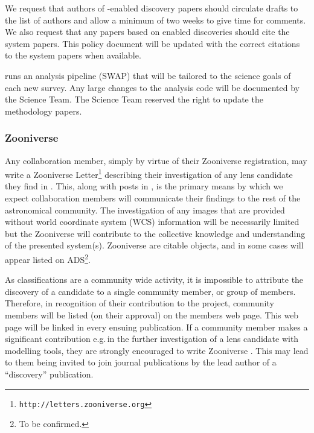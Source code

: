 \documentclass[a4paper]{article}
\begin{document}
We request that authors of \sw-enabled discovery papers should circulate drafts to the list of \sw authors and allow a minimum of two weeks to give time for comments. We also request that any papers based on \sw enabled discoveries should cite the \sw system papers. This policy document will be updated with the correct citations to the \sw system papers when available.

\sw runs an analysis pipeline (SWAP) that will be tailored to the science goals of each new survey. Any large changes to the analysis code will be documented  by the \sw Science Team. The \sw Science Team reserved the right to update the \sw methodology papers.





\subsubsection{Zooniverse \Letters}
\label{sec:comm}

Any \sw collaboration member, simply by virtue of their Zooniverse
registration, may write a Zooniverse
Letter\footnote{\texttt{http://letters.zooniverse.org}} describing their
investigation of any lens candidate they find in \sw. This, along with
posts in  \Talk, is the primary means by which we expect collaboration
members will communicate their findings to the rest of the
astronomical community. The investigation of any \sw images that are
provided without world coordinate system (WCS) information will be
necessarily limited but the \sw Zooniverse \Letters will contribute to the collective knowledge and understanding of the presented system(s). Zooniverse \Letters are citable
objects, and in some cases will appear listed on ADS\footnote{To be confirmed.}. 


As \sw classifications are a community wide activity, it is impossible to attribute the discovery of a candidate to a single community member, or group  of members. Therefore, in recognition of their contribution to the \sw project, \sw community members will be listed (on their approval) on the \sw members web page. This web page will be linked in every ensuing \sw publication. If a community member makes a significant contribution e.g.\,in the further investigation of a lens candidate with modelling tools, they are strongly encouraged to write Zooniverse \Letters. This may lead to them being invited to join journal publications by the lead author of a ``discovery'' publication. 
\end{document}
